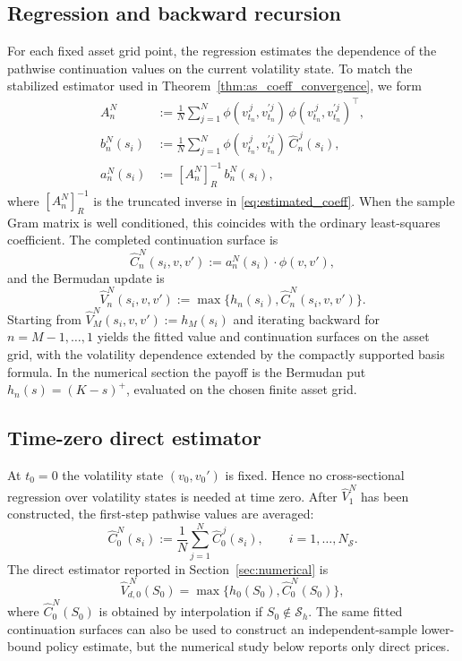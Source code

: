 \documentclass[10pt]{article}
\theoremstyle{plain}
\theoremstyle{definition}
\theoremstyle{remark}
\begin{document}
\subsection{Regression and backward recursion}
For each fixed asset grid point, the regression estimates the dependence of the pathwise continuation values on the current volatility state. To match the stabilized estimator used in Theorem~\ref{thm:as_coeff_convergence}, we form
\begin{equation}
\begin{aligned}
A_n^N
&:=\frac1N\sum_{j=1}^N
\phi(v_{t_n}^{\,j},v_{t_n}^{\prime j})\,
\phi(v_{t_n}^{\,j},v_{t_n}^{\prime j})^\top,\\
b_n^N(s_i)
&:=\frac1N\sum_{j=1}^N
\phi(v_{t_n}^{\,j},v_{t_n}^{\prime j})\,\widehat C_n^{\,j}(s_i),\\
a_n^N(s_i)&:=[A_n^N]^{-1}_R\,b_n^N(s_i),
\end{aligned}
\label{eq:lsq}
\end{equation}
where $[A_n^N]^{-1}_R$ is the truncated inverse in \eqref{eq:estimated_coeff}. When the sample Gram matrix is well conditioned, this coincides with the ordinary least-squares coefficient.
The completed continuation surface is
\[
\widehat C_n^{N}(s_i,v,v'):=a_n^{N}(s_i)\cdot\phi(v,v'),
\]
and the Bermudan update is
\[
\widehat V_n^{N}(s_i,v,v')
:=\max\{h_n(s_i),\widehat C_n^{N}(s_i,v,v')\}.
\]
Starting from $\widehat V_M^{N}(s_i,v,v'):=h_M(s_i)$ and iterating backward for $n=M-1,\dots,1$ yields the fitted value and continuation surfaces on the asset grid, with the volatility dependence extended by the compactly supported basis formula. In the numerical section the payoff is the Bermudan put $h_n(s)=(K-s)^+$, evaluated on the chosen finite asset grid.

\subsection{Time-zero direct estimator}
At $t_0=0$ the volatility state $(v_0,v_0')$ is fixed. Hence no cross-sectional regression over volatility states is needed at time zero. After $\widehat V_1^N$ has been constructed, the first-step pathwise values are averaged:
\[
\widehat C_0^{N}(s_i):=\frac1N\sum_{j=1}^N\widehat C_0^{\,j}(s_i),
\qquad i=1,\dots,N_{\mathcal S}.
\]
The direct estimator reported in Section~\ref{sec:numerical} is
\[
\widehat V_{d,0}^{\,N}(S_0)
=
\max\{h_0(S_0),\widehat C_0^{N}(S_0)\},
\]
where $\widehat C_0^{N}(S_0)$ is obtained by interpolation if $S_0\notin\mathcal S_h$. The same fitted continuation surfaces can also be used to construct an independent-sample lower-bound policy estimate, but the numerical study below reports only direct prices.
\end{document}
